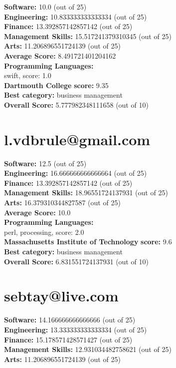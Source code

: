 \documentclass{article}
\begin{document}
\textbf{Software:} 10.0 (out of 25)\\
\textbf{Engineering: } 10.833333333333334 (out of 25)\\
\textbf{Finance:} 13.392857142857142 (out of 25)\\
\textbf{Management Skills:} 15.517241379310345 (out of 25)\\
\textbf{Arts:} 11.206896551724139 (out of 25)\\
\textbf{Average Score: } 8.491721401204162\\
\textbf{Programming Languages:} \\
swift, score: 1.0\\
\textbf{Dartmouth College} \textbf{score:} 9.35\\
\textbf{Best category: } business management\\
\textbf{Overall Score: }5.777982348111658 (out of 10)\section{l.vdbrule@gmail.com}
\textbf{Software:} 12.5 (out of 25)\\
\textbf{Engineering: } 16.666666666666664 (out of 25)\\
\textbf{Finance:} 13.392857142857142 (out of 25)\\
\textbf{Management Skills:} 18.96551724137931 (out of 25)\\
\textbf{Arts:} 16.379310344827587 (out of 25)\\
\textbf{Average Score: } 10.0\\
\textbf{Programming Languages:} \\
perl, processing, score: 2.0\\
\textbf{Massachusetts Institute of Technology} \textbf{score:} 9.6\\
\textbf{Best category: } business management\\
\textbf{Overall Score: }6.831551724137931 (out of 10)\section{sebtay@live.com}
\textbf{Software:} 14.166666666666666 (out of 25)\\
\textbf{Engineering: } 13.333333333333334 (out of 25)\\
\textbf{Finance:} 15.178571428571427 (out of 25)\\
\textbf{Management Skills:} 12.931034482758621 (out of 25)\\
\textbf{Arts:} 11.206896551724139 (out of 25)\\
\end{document}
